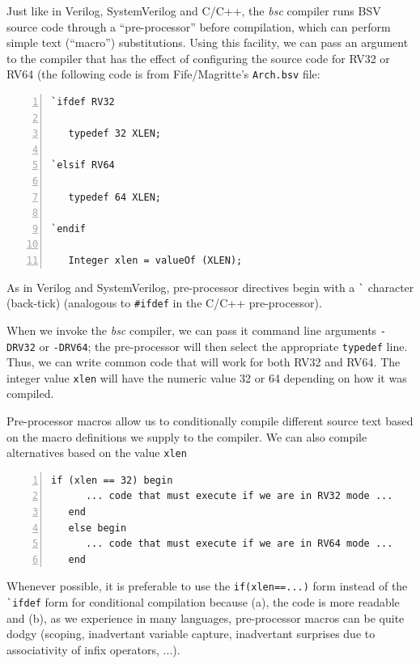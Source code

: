 \label{BSV_Conditional_compilation}


Just like in Verilog, SystemVerilog and C/C++, the \emph{bsc} compiler
runs BSV source code through a ``pre-processor'' before compilation,
which can perform simple text (``macro'') substitutions.  Using this
facility, we can pass an argument to the compiler that has the effect
of configuring the source code for RV32 or RV64 (the following code is
from Fife/Magritte's \verb|Arch.bsv| file:

\begin{Verbatim}[frame=single, numbers=left]
`ifdef RV32

   typedef 32 XLEN;

`elsif RV64

   typedef 64 XLEN;

`endif

   Integer xlen = valueOf (XLEN);
\end{Verbatim}

As in Verilog and SystemVerilog, pre-processor directives begin with a
\verb|`| character (back-tick) (analogous to \verb|#ifdef| in the
C/C++ pre-processor).

When we invoke the \emph{bsc} compiler, we can pass it command line
arguments \verb|-DRV32| or \verb|-DRV64|; the pre-processor will then
select the appropriate \verb|typedef| line.  Thus, we can write common
code that will work for both RV32 and RV64.  The integer value
\verb|xlen| will have the numeric value 32 or 64 depending on how it
was compiled.

Pre-processor macros allow us to conditionally compile different
source text based on the macro definitions we supply to the compiler.
We can also compile alternatives based on the value \verb|xlen|

\begin{Verbatim}[frame=single, numbers=left]
   if (xlen == 32) begin
      ... code that must execute if we are in RV32 mode ...
   end
   else begin
      ... code that must execute if we are in RV64 mode ...
   end
\end{Verbatim}

Whenever possible, it is preferable to use the \verb|if(xlen==...)|
form instead of the \verb|`ifdef| form for conditional compilation
because (a), the code is more readable and (b), as we experience in
many languages, pre-processor macros can be quite dodgy (scoping,
inadvertant variable capture, inadvertant surprises due to
associativity of infix operators, ...).

